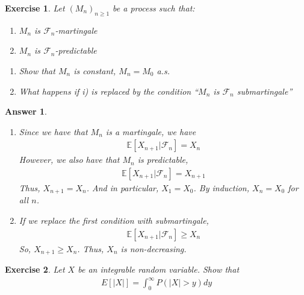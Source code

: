 \documentclass[12pt]{article}
\theoremstyle{colon}
\newtheorem{exercise}{Exercise}
\newtheorem*{answer}{Answer}
\begin{document}
\clearpage

\begin{exercise}
  Let $(M_n)_{n \geq 1}$ be a process such that:
  \begin{enumerate}[label=\roman*)]
    \item $M_n$ is $\mathcal{F}_n$-martingale
    \item $M_n$ is $\mathcal{F}_n$-predictable
  \end{enumerate}
  \begin{enumerate}[label=\alph*)]
    \item Show that $M_n$ is constant, $M_n = M_0$ a.s.
    \item What happens if i) is replaced by the condition ``$M_n$ is $\mathcal{F}_n$ submartingale''
  \end{enumerate}
\end{exercise}

\begin{answer}
  \leavevmode
  \begin{enumerate}[label=\alph*)]
    \item Since we have that $M_n$ is a martingale, we have
      \begin{gather*}
        \mathbb{E}[ X_{n+1} | \mathcal{F}_n ] = X_n
      \end{gather*}
      However, we also have that $M_n$ is predictable,
      \begin{gather*}
        \mathbb{E}[ X_{n+1} | \mathcal{F}_n ] = X_{n+1}
      \end{gather*}
      Thus, $X_{n+1} = X_n$. And in particular, $X_1 = X_0$. By induction, $X_n = X_0$ for all $n$.
    \item If we replace the first condition with submartingale,
      \begin{gather*}
        \mathbb{E}[ X_{n+1} | \mathcal{F}_n ] \geq X_n
      \end{gather*}
      So, $X_{n+1} \geq X_n$. Thus, $X_n$ is non-decreasing.
  \end{enumerate}
\end{answer}

\clearpage

\begin{exercise}
  Let $X$ be an integrable random variable. Show that
  \begin{gather*}
    E[ \lvert X \rvert ] = \int_0^\infty P( \lvert X \rvert > y) dy
  \end{gather*}
\end{exercise}
\end{document}
